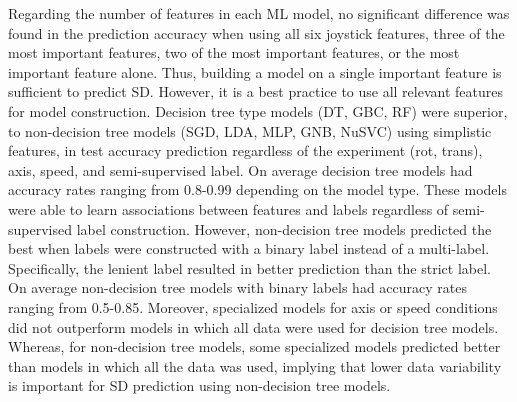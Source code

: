\documentclass{ieeeaccess}
\begin{document}
\indent Regarding the number of features in each ML model, no significant difference was found in the prediction accuracy when using all six joystick features, three of the most important features, two of the most important features, or the most important feature alone. Thus, building a model on a single important feature is sufficient to predict SD. However, it is a best practice to use all relevant features for model construction. Decision tree type models (DT, GBC, RF) were superior, to non-decision tree models (SGD, LDA, MLP, GNB, NuSVC) using simplistic features, in test accuracy prediction regardless of the experiment (rot, trans), axis, speed, and semi-supervised label. On average decision tree models had accuracy rates ranging from 0.8-0.99 depending on the model type. These models were able to learn associations between features and labels regardless of semi-supervised label construction. However, non-decision tree models predicted the best when labels were constructed with a binary label instead of a multi-label. Specifically, the lenient label resulted in better prediction than the strict label. On average non-decision tree models with binary labels had accuracy rates ranging from 0.5-0.85. Moreover, specialized models for axis or speed conditions did not outperform models in which all data were used for decision tree models. Whereas, for non-decision tree models, some specialized models predicted better than models in which all the data was used, implying that lower data variability is important for SD prediction using non-decision tree models.

\end{document}
